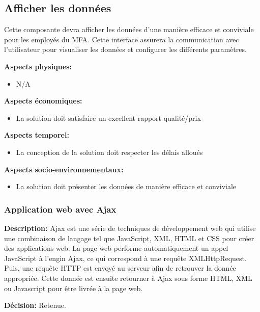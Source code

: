 \subsection{Afficher les données}
Cette composante devra afficher les données d'une manière efficace et conviviale pour les employés du MFA. Cette interface assurera la communication avec l'utilisateur pour visualiser les données et configurer les différents paramètres. \vspace{5mm}

\textbf{Aspects physiques:}
\begin{itemize} [label = {--}]
    \item N/A
\end{itemize}

\textbf{Aspects économiques:}
\begin{itemize} [label = {--}]
    \item La solution doit satisfaire un excellent rapport qualité/prix
\end{itemize}

\textbf{Aspects temporel:}
\begin{itemize} [label = {--}]
    \item La conception de la solution doit respecter les délais alloués
\end{itemize}

\textbf{Aspects socio-environnementaux:}
\begin{itemize} [label = {--}]
    \item La solution doit présenter les données de manière efficace et conviviale
\end{itemize}


\subsubsection{Application web avec Ajax}

\textbf{Description:} Ajax est une série de techniques de développement web qui utilise une combinaison de langage tel que JavaScript, XML, HTML et CSS pour créer des applications web. La page web performe automatiquement un appel JavaScript à l'engin Ajax, ce qui correspond à une requête XMLHttpRequest. Puis, une requête HTTP est envoyé au serveur afin de retrouver la donnée appropriée. Cette donnée est ensuite retourner à Ajax sous forme HTML, XML ou Javascript pour être livrée à la page web.  \vspace{5mm}


\textbf{Décision:} Retenue. \vspace{5mm}

